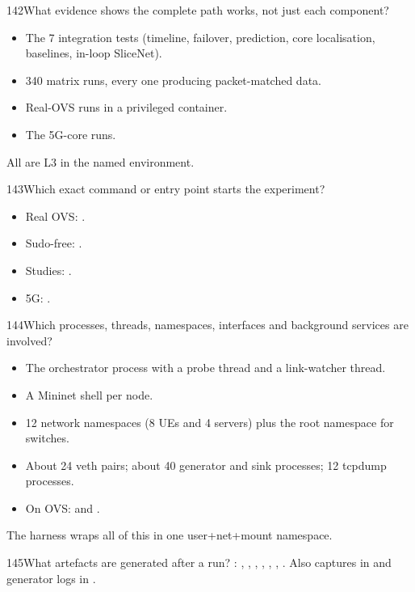 \begin{qa}{142}{What evidence shows the complete path works, not just each component?}
\begin{itemize}
\item The 7 integration tests (timeline, failover, prediction, core localisation, baselines, in-loop SliceNet).
\item 340 matrix runs, every one producing packet-matched data.
\item Real-OVS runs in a privileged container.
\item The 5G-core runs.
\end{itemize}
All are L3 in the named environment.
\end{qa}

\begin{qa}{143}{Which exact command or entry point starts the experiment?}
\begin{itemize}
\item Real OVS: .
\item Sudo-free: .
\item Studies: .
\item 5G: .
\end{itemize}
\end{qa}

\begin{qa}{144}{Which processes, threads, namespaces, interfaces and background services are involved?}
\begin{itemize}
\item The orchestrator process with a probe thread and a link-watcher thread.
\item A Mininet shell per node.
\item 12 network namespaces (8 UEs and 4 servers) plus the root namespace for switches.
\item About 24 veth pairs; about 40 generator and sink processes; 12 tcpdump processes.
\item On OVS:  and .
\end{itemize}
The harness wraps all of this in one user+net+mount namespace.
\end{qa}

\begin{qa}{145}{What artefacts are generated after a run?}
: , , , ,
, , . Also captures in
 and generator logs in .
\end{qa}

